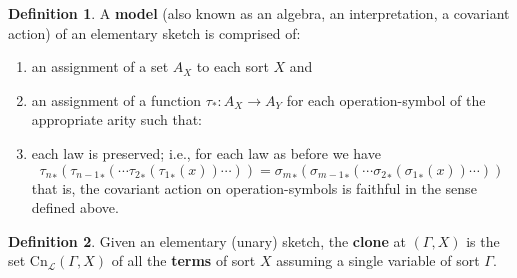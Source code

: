 \documentclass[12pt,twoside]{reedthesis}
\theoremstyle{definition}
\newtheorem{definition}{Definition}
\newtheorem{example}{Example}
\theoremstyle{remark}
\theoremstyle{theorem}
\begin{document}
  \begin{definition}
    A \textbf{model} (also known as an algebra, an interpretation, a covariant
    action) of an elementary sketch is comprised of:
    \begin{enumerate}
      \item an assignment of a set $A_X$ to each sort $X$ and
      \item an assignment of a function $\tau_* : A_X \rightarrow A_Y$ for each
            operation-symbol of the appropriate arity such that:
      \item each law is preserved; i.e., for each law as before we have
            \[ {\tau_n}_* ({\tau_{n-1}}_* (\cdots {\tau_2}_* ({\tau_1}_* (x))\cdots )) = {\sigma_m}_* ({\sigma_{m-1}}_*(\cdots {\sigma_2}_* ({\sigma_1}_* (x))\cdots )) \]
            that is, the covariant action on operation-symbols is faithful in
            the sense defined above.
    \end{enumerate}
  \end{definition}


  \begin{definition}
    Given an elementary (unary) sketch, the \textbf{clone} at \( (\Gamma, X) \) is
    the set \( \text{Cn}_\mathcal{L} (\Gamma, X) \) of all the \textbf{terms} of sort
    $X$ assuming a single variable of sort $\Gamma$.
  \end{definition}
\end{document}
